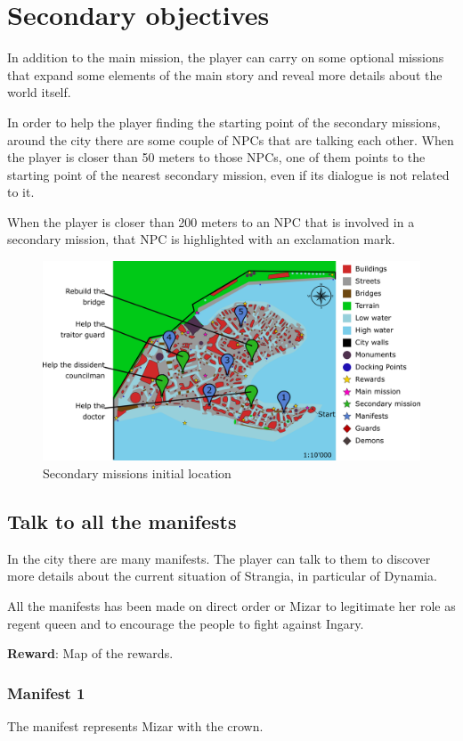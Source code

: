 \section{Secondary objectives}
In addition to the main mission, the player can carry on some optional missions that expand some elements of the main story and reveal more details about the world itself.

In order to help the player finding the starting point of the secondary missions, around the city there are some couple of NPCs that are talking each other. When the player is closer than 50 meters to those NPCs, one of them points to the starting point of the nearest secondary mission, even if its dialogue is not related to it.

When the player is closer than 200 meters to an NPC that is involved in a secondary mission, that NPC is highlighted with an exclamation mark.

\begin{figure}[H]
  \centering
  \includegraphics[width=\textwidth]{../Images/Maps/dynamiaSecondaryMissions}
  \caption{Secondary missions initial location}
\end{figure}

\subsection{Talk to all the manifests}
In the city there are many manifests. The player can talk to them to discover more details about the current situation of Strangia, in particular of Dynamia.

All the manifests has been made on direct order or Mizar to legitimate her role as regent queen and to encourage the people to fight against Ingary.

\textbf{Reward}: Map of the rewards.

\subsubsection*{Manifest 1}
The manifest represents Mizar with the crown.


